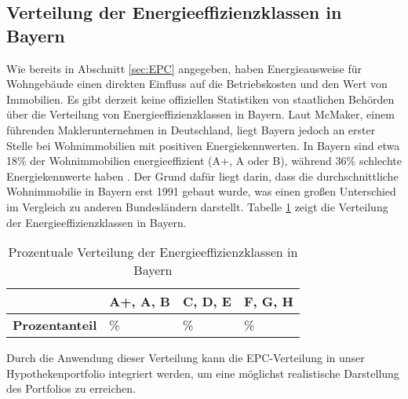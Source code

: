 \subsection{Verteilung der Energieeffizienzklassen in Bayern}
Wie bereits in Abschnitt \ref{sec:EPC} angegeben, haben Energieausweise für Wohngebäude einen direkten Einfluss auf die Betriebskosten und den Wert von Immobilien. Es gibt derzeit keine offiziellen Statistiken von staatlichen Behörden über die Verteilung von Energieeffizienzklassen in Bayern. Laut McMaker, einem führenden Maklerunternehmen in Deutschland, liegt Bayern jedoch an erster Stelle bei Wohnimmobilien mit positiven Energiekennwerten. In Bayern sind etwa 18\% der Wohnimmobilien energieeffizient (A+, A oder B), während 36\% schlechte Energiekennwerte haben \parencite{mcmakler2022}. Der Grund dafür liegt darin, dass die durchschnittliche Wohnimmobilie in Bayern erst 1991 gebaut wurde, was einen großen Unterschied im Vergleich zu anderen Bundesländern darstellt. Tabelle \ref{tab:epc_bayern} zeigt die Verteilung der Energieeffizienzklassen in Bayern.
\begin{table}[htbp]
    \centering
    \caption{Prozentuale Verteilung der Energieeffizienzklassen in Bayern}
    \label{tab:epc_bayern}
    \begin{tabularx}{\textwidth}{>{\raggedright\arraybackslash}X >{\centering\arraybackslash}X >{\centering\arraybackslash}X >{\centering\arraybackslash}X}
        \toprule
        & \textbf{A+, A, B} & \textbf{C, D, E} & \textbf{F, G, H} \\
        \midrule
        \textbf{Prozentanteil} & 18\% & 46\% & 36\% \\
        \bottomrule
    \end{tabularx}
\end{table}

Durch die Anwendung dieser Verteilung kann die \ac{EPC}-Verteilung in unser Hypothekenportfolio integriert werden, um eine möglichst realistische Darstellung des Portfolios zu erreichen.

